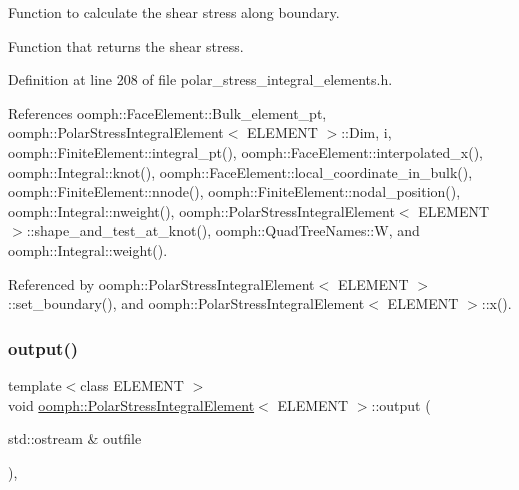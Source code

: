 Function to calculate the shear stress along boundary. 

Function that returns the shear stress. 

Definition at line 208 of file polar\+\_\+stress\+\_\+integral\+\_\+elements.\+h.



References oomph\+::\+Face\+Element\+::\+Bulk\+\_\+element\+\_\+pt, oomph\+::\+Polar\+Stress\+Integral\+Element$<$ E\+L\+E\+M\+E\+N\+T $>$\+::\+Dim, i, oomph\+::\+Finite\+Element\+::integral\+\_\+pt(), oomph\+::\+Face\+Element\+::interpolated\+\_\+x(), oomph\+::\+Integral\+::knot(), oomph\+::\+Face\+Element\+::local\+\_\+coordinate\+\_\+in\+\_\+bulk(), oomph\+::\+Finite\+Element\+::nnode(), oomph\+::\+Finite\+Element\+::nodal\+\_\+position(), oomph\+::\+Integral\+::nweight(), oomph\+::\+Polar\+Stress\+Integral\+Element$<$ E\+L\+E\+M\+E\+N\+T $>$\+::shape\+\_\+and\+\_\+test\+\_\+at\+\_\+knot(), oomph\+::\+Quad\+Tree\+Names\+::W, and oomph\+::\+Integral\+::weight().



Referenced by oomph\+::\+Polar\+Stress\+Integral\+Element$<$ E\+L\+E\+M\+E\+N\+T $>$\+::set\+\_\+boundary(), and oomph\+::\+Polar\+Stress\+Integral\+Element$<$ E\+L\+E\+M\+E\+N\+T $>$\+::x().

\mbox{\label{classoomph_1_1PolarStressIntegralElement_a02bac6dcd43010bafb383d420502af8d}} 
\subsubsection{\texorpdfstring{output()}{output()}\hspace{0.1cm}{\footnotesize\ttfamily [1/2]}}
{\footnotesize\ttfamily template$<$class E\+L\+E\+M\+E\+NT $>$ \\
void \hyperlink{classoomph_1_1PolarStressIntegralElement}{oomph\+::\+Polar\+Stress\+Integral\+Element}$<$ E\+L\+E\+M\+E\+NT $>$\+::output (\begin{DoxyParamCaption}\item[{std\+::ostream \&}]{outfile }\end{DoxyParamCaption})\hspace{0.3cm}{\ttfamily [inline]}, {\ttfamily [virtual]}}



